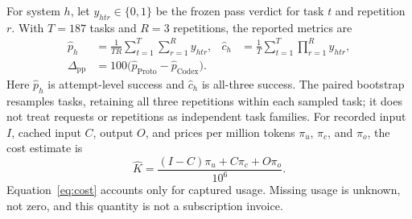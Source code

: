 For system $h$, let $y_{htr}\in\{0,1\}$ be the frozen pass verdict for task $t$
and repetition $r$. With $T=187$ tasks and $R=3$ repetitions, the reported metrics are
\begin{align}
  \widehat p_h &= \frac{1}{TR}\sum_{t=1}^{T}\sum_{r=1}^{R}y_{htr},
  &\widehat c_h &= \frac{1}{T}\sum_{t=1}^{T}\prod_{r=1}^{R}y_{htr},\label{eq:success}\\
  \Delta_{\mathrm{pp}} &= 100\bigl(\widehat p_{\mathrm{Proto}}-\widehat p_{\mathrm{Codex}}\bigr).
  &&\label{eq:gap}
\end{align}
Here $\widehat p_h$ is attempt-level success and $\widehat c_h$ is all-three success.
The paired bootstrap resamples tasks, retaining all three repetitions within each sampled task;
it does not treat requests or repetitions as independent task families.
For recorded input $I$, cached input $C$, output $O$, and prices per million tokens
$\pi_u$, $\pi_c$, and $\pi_o$, the cost estimate is
\begin{equation}
  \widehat K=\frac{(I-C)\pi_u+C\pi_c+O\pi_o}{10^6}.
  \label{eq:cost}
\end{equation}
Equation~\eqref{eq:cost} accounts only for captured usage. Missing usage is unknown,
not zero, and this quantity is not a subscription invoice.
